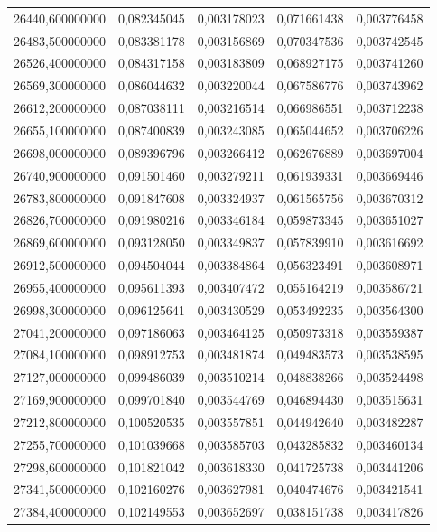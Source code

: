 \begin{longtable}{rrrrr}
26440,600000000 & 0,082345045 & 0,003178023 & 0,071661438 & 0,003776458\\
26483,500000000 & 0,083381178 & 0,003156869 & 0,070347536 & 0,003742545\\
26526,400000000 & 0,084317158 & 0,003183809 & 0,068927175 & 0,003741260\\
26569,300000000 & 0,086044632 & 0,003220044 & 0,067586776 & 0,003743962\\
26612,200000000 & 0,087038111 & 0,003216514 & 0,066986551 & 0,003712238\\
26655,100000000 & 0,087400839 & 0,003243085 & 0,065044652 & 0,003706226\\
26698,000000000 & 0,089396796 & 0,003266412 & 0,062676889 & 0,003697004\\
26740,900000000 & 0,091501460 & 0,003279211 & 0,061939331 & 0,003669446\\
26783,800000000 & 0,091847608 & 0,003324937 & 0,061565756 & 0,003670312\\
26826,700000000 & 0,091980216 & 0,003346184 & 0,059873345 & 0,003651027\\
26869,600000000 & 0,093128050 & 0,003349837 & 0,057839910 & 0,003616692\\
26912,500000000 & 0,094504044 & 0,003384864 & 0,056323491 & 0,003608971\\
26955,400000000 & 0,095611393 & 0,003407472 & 0,055164219 & 0,003586721\\
26998,300000000 & 0,096125641 & 0,003430529 & 0,053492235 & 0,003564300\\
27041,200000000 & 0,097186063 & 0,003464125 & 0,050973318 & 0,003559387\\
27084,100000000 & 0,098912753 & 0,003481874 & 0,049483573 & 0,003538595\\
27127,000000000 & 0,099486039 & 0,003510214 & 0,048838266 & 0,003524498\\
27169,900000000 & 0,099701840 & 0,003544769 & 0,046894430 & 0,003515631\\
27212,800000000 & 0,100520535 & 0,003557851 & 0,044942640 & 0,003482287\\
27255,700000000 & 0,101039668 & 0,003585703 & 0,043285832 & 0,003460134\\
27298,600000000 & 0,101821042 & 0,003618330 & 0,041725738 & 0,003441206\\
27341,500000000 & 0,102160276 & 0,003627981 & 0,040474676 & 0,003421541\\
27384,400000000 & 0,102149553 & 0,003652697 & 0,038151738 & 0,003417826\\

\end{longtable}
